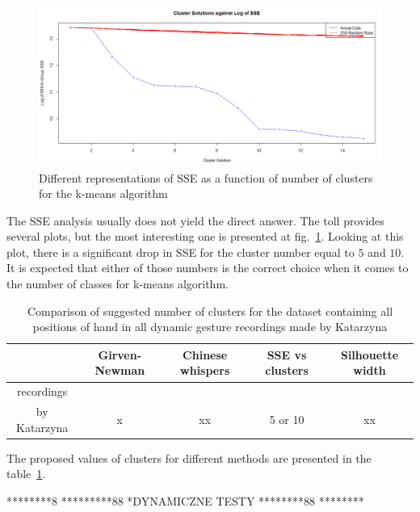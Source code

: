 \begin{figure}[htp!]
\centering
 \includegraphics[width=1.0\columnwidth]{figures/SSE1.png}
 \caption{Different representations of SSE as a function of number of clusters for the k-means algorithm}
 \label{dynamicSSE}
\end{figure}

The SSE analysis usually does not yield the direct answer.
The toll provides several plots, but the most interesting one is presented at fig.~\ref{dynamicSSE}. 
Looking at this plot, there is a significant drop in SSE for the cluster number equal to $5$ and $10$.
It is expected that either of those numbers is the correct choice when it comes to the number of classes for k-means algorithm.



\begin{table}[ht]
 \caption{Comparison of suggested number of clusters for the dataset containing all positions of hand in all dynamic gesture recordings made by Katarzyna}
 \label{clusterwyn}
    \begin{tabular}{ccccc}
    \hline
     & Girven-Newman & Chinese whispers   & SSE vs clusters & Silhouette width  \\ \hline
    recordings \\by Katarzyna          & x      & xx & 5 or 10     & xx     \\ \hline
    \end{tabular}
\end{table}

The proposed values of clusters for different methods are presented in the table~\ref{clusterwyn}.



********8
*********88
*DYNAMICZNE TESTY
********88
********


